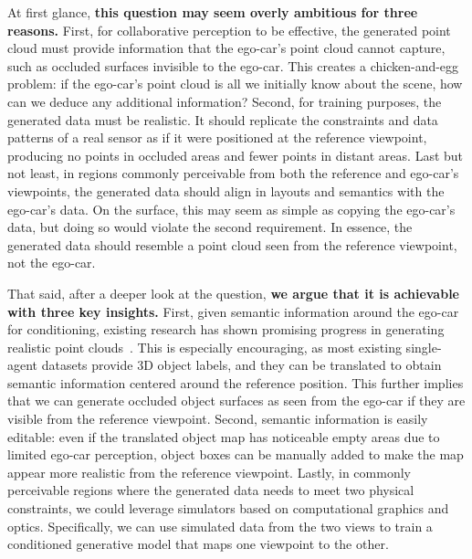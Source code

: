 At first glance, \textbf{this question may seem overly ambitious for three reasons.} First, for collaborative perception to be effective, the generated point cloud must provide information that the ego-car’s point cloud cannot capture, such as occluded surfaces invisible to the ego-car. This creates a chicken-and-egg problem: if the ego-car’s point cloud is all we initially know about the scene, how can we deduce any additional information?
Second, for training purposes, the generated data must be realistic. It should replicate the constraints and data patterns of a real sensor as if it were positioned at the reference viewpoint, producing no points in occluded areas and fewer points in distant areas. 
Last but not least, in regions commonly perceivable from both the reference and ego-car's viewpoints, the generated data should align in layouts and semantics with the ego-car's data. On the surface, this may seem as simple as copying the ego-car's data, but doing so would violate the second requirement. In essence, the generated data should resemble a point cloud seen from the reference viewpoint, not the ego-car.


That said, after a deeper look at the question, \textbf{we argue that it is achievable with three key insights.} First, given semantic information around the ego-car for conditioning, existing research has shown promising progress in generating realistic point clouds~\citep{ran2024towards, hu2025rangeldm, wu2024text2lidar, nakashima2024lidar-r2dm, zyrianov2024lidardm, xiong2023ultralidar, zyrianov2022learning-lidargen}. This is especially encouraging, as most existing single-agent datasets provide 3D object labels, and they can be translated to obtain semantic information centered around the reference position. This further implies that we can generate occluded object surfaces as seen from the ego-car if they are visible from the reference viewpoint. Second, semantic information is easily editable: even if the translated object map has noticeable empty areas due to limited ego-car perception, object boxes can be manually added to make the map appear more realistic from the reference viewpoint. Lastly, in commonly perceivable regions where the generated data needs to meet two physical constraints, we could leverage simulators based on computational graphics and optics. Specifically, we can use simulated data from the two views to train a conditioned generative model that maps one viewpoint to the other.

